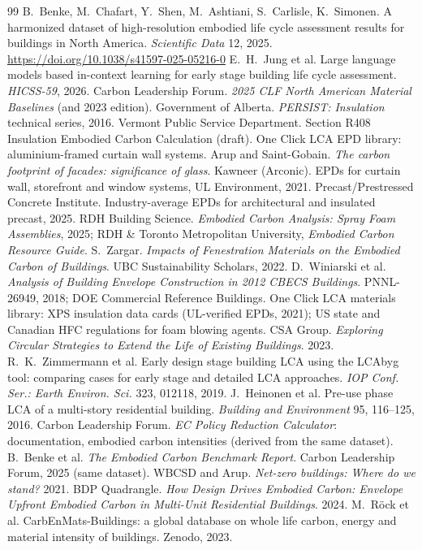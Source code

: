 \documentclass[10pt,letterpaper]{article}
\begin{document}
\begin{thebibliography}{99}\small\sloppy
{} B.~Benke, M.~Chafart, Y.~Shen, M.~Ashtiani, S.~Carlisle, K.~Simonen. A harmonized dataset of high-resolution embodied life cycle assessment results for buildings in North America. \emph{Scientific Data} 12, 2025. \url{https://doi.org/10.1038/s41597-025-05216-0}
 E.~H.~Jung et al. Large language models based in-context learning for early stage building life cycle assessment. \emph{HICSS-59}, 2026.
 Carbon Leadership Forum. \emph{2025 CLF North American Material Baselines} (and 2023 edition).
 Government of Alberta. \emph{PERSIST: Insulation} technical series, 2016.
 Vermont Public Service Department. Section R408 Insulation Embodied Carbon Calculation (draft).
 One Click LCA EPD library: aluminium-framed curtain wall systems.
 Arup and Saint-Gobain. \emph{The carbon footprint of facades: significance of glass}.
 Kawneer (Arconic). EPDs for curtain wall, storefront and window systems, UL Environment, 2021.
 Precast/Prestressed Concrete Institute. Industry-average EPDs for architectural and insulated precast, 2025.
 RDH Building Science. \emph{Embodied Carbon Analysis: Spray Foam Assemblies}, 2025; RDH \& Toronto Metropolitan University, \emph{Embodied Carbon Resource Guide}.
 S.~Zargar. \emph{Impacts of Fenestration Materials on the Embodied Carbon of Buildings}. UBC Sustainability Scholars, 2022.
 D.~Winiarski et al. \emph{Analysis of Building Envelope Construction in 2012 CBECS Buildings}. PNNL-26949, 2018; DOE Commercial Reference Buildings.
 One Click LCA materials library: XPS insulation data cards (UL-verified EPDs, 2021); US state and Canadian HFC regulations for foam blowing agents.
 CSA Group. \emph{Exploring Circular Strategies to Extend the Life of Existing Buildings}. 2023.
 R.~K.~Zimmermann et al. Early design stage building LCA using the LCAbyg tool: comparing cases for early stage and detailed LCA approaches. \emph{IOP Conf. Ser.: Earth Environ. Sci.} 323, 012118, 2019.
 J.~Heinonen et al. Pre-use phase LCA of a multi-story residential building. \emph{Building and Environment} 95, 116--125, 2016.
 Carbon Leadership Forum. \emph{EC Policy Reduction Calculator}: documentation, embodied carbon intensities (derived from the same dataset).
 B.~Benke et al. \emph{The Embodied Carbon Benchmark Report}. Carbon Leadership Forum, 2025 (same dataset).
 WBCSD and Arup. \emph{Net-zero buildings: Where do we stand?} 2021.
 BDP Quadrangle. \emph{How Design Drives Embodied Carbon: Envelope Upfront Embodied Carbon in Multi-Unit Residential Buildings}. 2024.
 M.~R\"ock et al. CarbEnMats-Buildings: a global database on whole life carbon, energy and material intensity of buildings. Zenodo, 2023.
\end{thebibliography}
\end{document}
